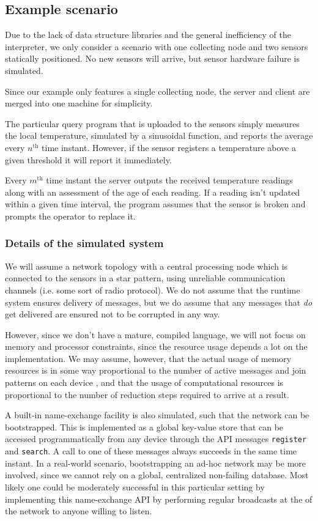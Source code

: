 \subsection*{Example scenario}

Due to the lack of data structure libraries and the general inefficiency of the
interpreter, we only consider a scenario with one collecting node and two
sensors statically positioned. No new sensors will arrive, but sensor hardware
failure is simulated.

Since our example only features a single collecting node, the server and client
are merged into one machine for simplicity.

The particular query program that is uploaded to the sensors simply measures
the local temperature, simulated by a sinusoidal function, and reports the
average every $n^{\text{th}}$ time instant.  However, if the sensor registers a
temperature above a given threshold it will report it immediately.

Every $m^\text{th}$ time instant the server outputs the received temperature
readings along with an assessment of the age of each reading. If a reading
isn't updated within a given time interval, the program assumes that the sensor
is broken and prompts the operator to replace it.

\subsubsection*{Details of the simulated system}

We will assume a network topology with a central processing node which is
connected to the sensors in a star pattern, using unreliable communication
channels (i.e. some sort of radio protocol).  We do not assume that the runtime
system ensures delivery of messages, but we do assume that any messages that
\emph{do} get delivered are ensured not to be corrupted in any way.

However, since we don't have a mature, compiled language, we will not focus on
memory and processor constraints, since the resource usage depends a lot on the
implementation. We may assume, however, that the actual usage of memory
resources is in some way proportional to the number of active messages and join
patterns on each device , and that the usage of computational resources is
proportional to the number of reduction steps required to arrive at a result.

A built-in name-exchange facility is also simulated, such that the network can
be bootstrapped. This is implemented as a global key-value store that can be
accessed programmatically from any device through the API messages
\verb!register! and \verb!search!. A call to one of these messages always
succeeds in the same time instant. In a real-world scenario, bootstrapping an
ad-hoc network may be more involved, since we cannot rely on a global,
centralized non-failing database.  Most likely one could be moderately
successful in this particular setting by implementing this name-exchange API by
performing regular broadcasts at the 
of the network to anyone willing to listen.

